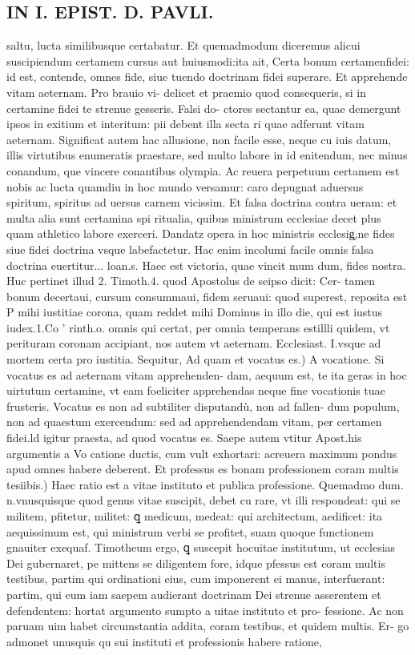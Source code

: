 \documentclass{article}
\begin{document}
\begin{pages}
\section*{IN I. EPIST. D. PAVLI. }
\marginpar{[ p.128 ]}\pstart saltu, lucta similibusque certabatur. Et quemadmodum diceremus alicui suscipiendum certamem cursus aut huiusmodi:ita ait, Certa bonum certamenfidei: id est, contende, omnes fide, siue tuendo doctrinam fidei superare. Et apprehende vitam aeternam. Pro brauio vi- delicet et praemio quod consequeris, si in certamine fidei te strenue gesseris. Falsi do- ctores sectantur ea, quae demergunt ipsos in exitium et interitum: pii debent illa secta ri quae adferunt vitam aeternam. Significat autem hac allusione, non facile esse, neque cu iuis datum, illis virtutibus enumeratis praestare, sed multo labore in id enitendum, nec minus conandum, que vincere conantibus olympia. Ac reuera perpetuum certamem est nobis ac lucta quamdiu in hoc mundo versamur: caro depugnat aduersus spiritum, spiritus ad uersus carnem vicissim. Et falsa doctrina contra ueram: et multa alia sunt certamina spi ritualia, quibus ministrum ecclesiae decet plus quam athletico labore exerceri. Dandatz opera in hoc ministris ecclesig̨,ne fides siue fidei doctrina vsque labefactetur. Hac enim incolumi facile omnis falsa doctrina euertitur... loan.s. Haec est victoria, quae vincit mum dum, fides nostra. Huc pertinet illud 2. Timoth.4. quod Apostolus de seipso dicit: Cer- tamen bonum decertaui, cursum consummaui, fidem seruaui: quod superest, reposita est P mihi iustitiae corona, quam reddet mihi Dominus in illo die, qui est iustus iudex.1.Co ' rinth.o. omnis qui certat, per omnia temperans estillli quidem, vt perituram coronam accipiant, nos autem vt aeternam. Ecclesiast. I.vsque ad mortem certa pro iustitia. Sequitur,  \pend\pstart Ad quam et vocatus es.) A vocatione. Si vocatus es ad aeternam vitam apprehenden- dam, aequum est, te ita geras in hoc uirtutum certamine, vt eam foeliciter apprehendas neque fine vocationis tuae frusteris. Vocatus es non ad subtiliter disputandù, non ad fallen- dum populum, non ad quaestum exercendum: sed ad apprehendendam vitam, per certamen fidei.ld igitur praesta, ad quod vocatus es. Saepe autem vtitur Apost.his argumentis a Vo catione ductis, cum vult exhortari: acreuera maximum pondus apud omnes habere deberent.  \pend\pstart Et professus es bonam professionem coram multis tesiibis.) Haec ratio est a vitae instituto et publica professione. Quemadmo dum. n.vnusquisque quod genus vitae suscipit, debet cu rare, vt illi respondeat: qui se militem, pfitetur, militet: ꝗ medicum, medeat: qui architectum, aedificet: ita aequissimum est, qui ministrum verbi se profitet, suam quoque functionem gnauiter exequaf. Timotheum ergo, ꝗ suscepit hocuitae institutum, ut ecclesias Dei gubernaret, pe mittens se diligentem fore, idque pfessus est coram multis testibus, partim qui ordinationi eius, cum imponerent ei manus, interfuerant: partim, qui eum iam saepem audierant doctrinam Dei strenue asserentem et defendentem: hortat argumento sumpto a uitae instituto et pro- fessione. Ac non paruam uim habet circumstantia addita, coram testibus, et quidem multis. Er- go admonet unusquis qu sui instituti et professionis habere ratione, 
\end{pages}
\end{document}
